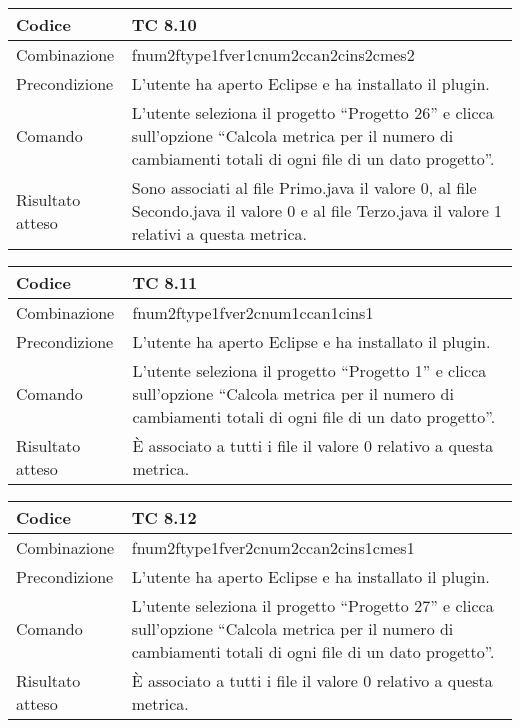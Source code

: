 \begin{table}[ht]
\begin{tabular}{|p{3cm}|p{9cm}|}
\hline
\cellcolor{lightgray}Codice				& TC 8.10								\\
\hline
\cellcolor{lightgray}Combinazione		& fnum2ftype1fver1cnum2ccan2cins2cmes2									\\
\hline
\cellcolor{lightgray}Precondizione		& L'utente ha aperto Eclipse e ha installato il plugin.		\\
\hline
\cellcolor{lightgray}Comando			& L'utente seleziona il progetto ``Progetto 26''  e clicca sull'opzione ``Calcola metrica per il numero di cambiamenti totali di ogni file di un dato progetto''.	\\
\hline
\cellcolor{lightgray}Risultato atteso	& Sono associati al file Primo.java il valore 0, al file Secondo.java il valore 0 e al file Terzo.java il valore 1 relativi a questa metrica.\\
\hline
\end{tabular}
\end{table}

\clearpage


\begin{table}[ht]
\begin{tabular}{|p{3cm}|p{9cm}|}
\hline
\cellcolor{lightgray}Codice				& TC 8.11								\\
\hline
\cellcolor{lightgray}Combinazione		& fnum2ftype1fver2cnum1ccan1cins1									\\
\hline
\cellcolor{lightgray}Precondizione		& L'utente ha aperto Eclipse e ha installato il plugin.		\\
\hline
\cellcolor{lightgray}Comando			& L'utente seleziona il progetto ``Progetto 1''  e clicca sull'opzione ``Calcola metrica per il numero di cambiamenti totali di ogni file di un dato progetto''.	\\
\hline
\cellcolor{lightgray}Risultato atteso	& È associato a tutti i file il valore 0 relativo a questa metrica.\\
\hline
\end{tabular}
\end{table}

\begin{table}[ht]
\begin{tabular}{|p{3cm}|p{9cm}|}
\hline
\cellcolor{lightgray}Codice				& TC 8.12								\\
\hline
\cellcolor{lightgray}Combinazione		& fnum2ftype1fver2cnum2ccan2cins1cmes1									\\
\hline
\cellcolor{lightgray}Precondizione		& L'utente ha aperto Eclipse e ha installato il plugin.		\\
\hline
\cellcolor{lightgray}Comando			& L'utente seleziona il progetto ``Progetto 27''  e clicca sull'opzione ``Calcola metrica per il numero di cambiamenti totali di ogni file di un dato progetto''.	\\
\hline
\cellcolor{lightgray}Risultato atteso	& È associato a tutti i file il valore 0 relativo a questa metrica.\\
\hline
\end{tabular}
\end{table}

